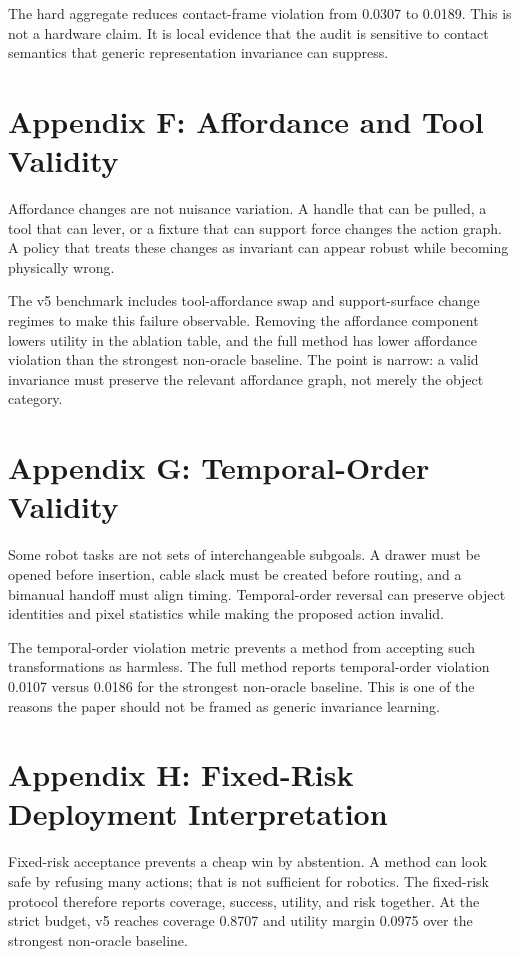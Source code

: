 \documentclass{article}
\begin{document}
The hard aggregate reduces contact-frame violation from 0.0307 to 0.0189. This is not a hardware claim. It is local evidence that the audit is sensitive to contact semantics that generic representation invariance can suppress.


\section{Appendix F: Affordance and Tool Validity}
Affordance changes are not nuisance variation. A handle that can be pulled, a tool that can lever, or a fixture that can support force changes the action graph. A policy that treats these changes as invariant can appear robust while becoming physically wrong.

The v5 benchmark includes tool-affordance swap and support-surface change regimes to make this failure observable. Removing the affordance component lowers utility in the ablation table, and the full method has lower affordance violation than the strongest non-oracle baseline. The point is narrow: a valid invariance must preserve the relevant affordance graph, not merely the object category.


\section{Appendix G: Temporal-Order Validity}
Some robot tasks are not sets of interchangeable subgoals. A drawer must be opened before insertion, cable slack must be created before routing, and a bimanual handoff must align timing. Temporal-order reversal can preserve object identities and pixel statistics while making the proposed action invalid.

The temporal-order violation metric prevents a method from accepting such transformations as harmless. The full method reports temporal-order violation 0.0107 versus 0.0186 for the strongest non-oracle baseline. This is one of the reasons the paper should not be framed as generic invariance learning.


\section{Appendix H: Fixed-Risk Deployment Interpretation}
Fixed-risk acceptance prevents a cheap win by abstention. A method can look safe by refusing many actions; that is not sufficient for robotics. The fixed-risk protocol therefore reports coverage, success, utility, and risk together. At the strict budget, v5 reaches coverage 0.8707 and utility margin 0.0975 over the strongest non-oracle baseline.
\end{document}
